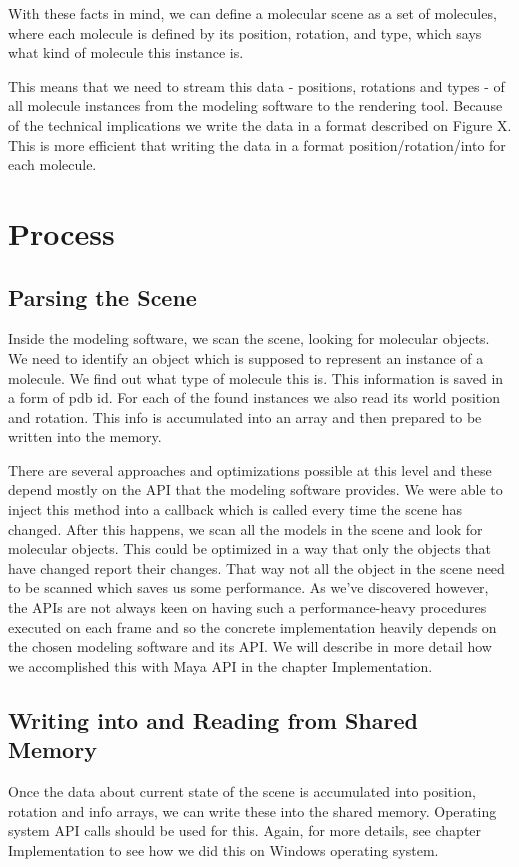 \documentclass[
  digital, %
  table,   %
  nolof,     %
  nolot,     %
]{fithesis3}
\begin{document}
With these facts in mind, we can define a molecular scene as a set of molecules, where each molecule is defined by its position, rotation, and type, which says what kind of molecule this instance is.

This means that we need to stream this data - positions, rotations and types - of all molecule instances from the modeling software to the rendering tool. Because of the technical implications we write the data in a format described on Figure X. This is more efficient that writing the data in a format position/rotation/into for each molecule.
\section{Process}
\subsection{Parsing the Scene}
Inside the modeling software, we scan the scene, looking for molecular objects. We need to identify an object which is supposed to represent an instance of a molecule. We find out what type of molecule this is. This information is saved in a form of pdb id. For each of the found instances we also read its world position and rotation. This info is accumulated into an array and then prepared to be written into the memory.

There are several approaches and optimizations possible at this level and these depend mostly on the API that the modeling software provides. We were able to inject this method into a callback which is called every time the scene has changed. After this happens, we scan all the models in the scene and look for molecular objects. This could be optimized in a way that only the objects that have changed report their changes. That way not all the object in the scene need to be scanned which saves us some performance. As we've discovered however, the APIs are not always keen on having such a performance-heavy procedures executed on each frame and so the concrete implementation heavily depends on the chosen modeling software and its API. We will describe in more detail how we accomplished this with Maya API in the chapter Implementation.

\subsection{Writing into and Reading from Shared Memory}
Once the data about current state of the scene is accumulated into position, rotation and info arrays, we can write these into the shared memory. Operating system API calls should be used for this. Again, for more details, see chapter Implementation to see how we did this on Windows operating system.
\end{document}
